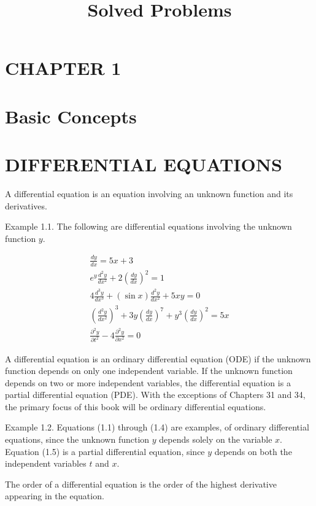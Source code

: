 \documentclass[10pt]{article}
\title{Solved Problems }
\author{}
\date{}
\begin{document}
\maketitle
\section*{CHAPTER 1}
\section*{Basic Concepts}
\section*{DIFFERENTIAL EQUATIONS}
A differential equation is an equation involving an unknown function and its derivatives.

Example 1.1. The following are differential equations involving the unknown function $y$.


\begin{gather*}
\frac{d y}{d x}=5 x+3  \tag{1.1}\\
e^{y} \frac{d^{2} y}{d x^{2}}+2\left(\frac{d y}{d x}\right)^{2}=1  \tag{1.2}\\
4 \frac{d^{3} y}{d x^{3}}+(\sin x) \frac{d^{2} y}{d x^{2}}+5 x y=0  \tag{1.3}\\
\left(\frac{d^{2} y}{d x^{2}}\right)^{3}+3 y\left(\frac{d y}{d x}\right)^{7}+y^{3}\left(\frac{d y}{d x}\right)^{2}=5 x  \tag{1.4}\\
\frac{\partial^{2} y}{\partial t^{2}}-4 \frac{\partial^{2} y}{\partial x^{2}}=0 \tag{1.5}
\end{gather*}


A differential equation is an ordinary differential equation (ODE) if the unknown function depends on only one independent variable. If the unknown function depends on two or more independent variables, the differential equation is a partial differential equation (PDE). With the exceptions of Chapters 31 and 34, the primary focus of this book will be ordinary differential equations.

Example 1.2. Equations (1.1) through (1.4) are examples, of ordinary differential equations, since the unknown function $y$ depends solely on the variable $x$. Equation (1.5) is a partial differential equation, since $y$ depends on both the independent variables $t$ and $x$.

The order of a differential equation is the order of the highest derivative appearing in the equation.
\end{document}
